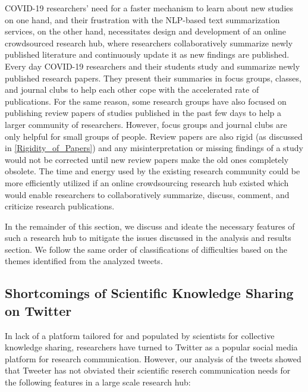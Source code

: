 \documentclass[acmsmall,authordraft]{acmart}
\begin{document}
COVID-19 researchers' need for a faster mechanism to learn about new studies on one hand, and their frustration with the NLP-based text summarization services, on the other hand, necessitates design and development of an online crowdsourced research hub, where researchers collaboratively summarize newly published literature and continuously update it as new findings are published. Every day COVID-19 researchers and their students study and summarize newly published research papers. They present their summaries in focus groups, classes, and journal clubs to help each other cope with the accelerated rate of publications. For the same reason, some research groups have also focused on publishing review papers of studies published in the past few days to help a larger community of researchers. However, focus groups and journal clubs are only helpful for small groups of people. Review papers are also rigid (as discussed in \autoref{Rigidity_of_Papers}) and any misinterpretation or missing findings of a study would not be corrected until new review papers make the old ones completely obsolete. The time and energy used by the existing research community could be more efficiently utilized if an online crowdsourcing research hub existed which would enable researchers to collaboratively summarize, discuss, comment, and criticize research publications.

In the remainder of this section, we discuss and ideate the necessary features of such a research hub to mitigate the issues discussed in the analysis and results section. We follow the same order of classifications of difficulties based on the themes identified from the analyzed tweets.

\subsection{Shortcomings of Scientific Knowledge Sharing on Twitter}
\label{Shortcomings of Scientific Knowledge Sharing on Twitter}

In lack of a platform tailored for and populated by scientists for collective knowledge sharing, researchers have turned to Twitter as a popular social media platform for research communication. However, our analysis of the tweets showed that Tweeter has not obviated their scientific reserch communication needs for the following features in a large scale research hub:
\end{document}
